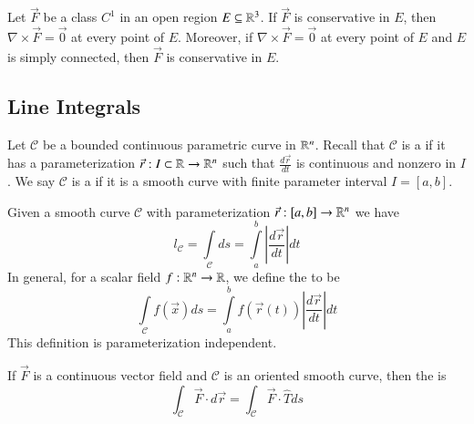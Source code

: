 \documentclass[12pt, a4paper, oneside, openright, titlepage]{book}
\begin{document}
\begin{appendices}
    
    \begin{thm}
        Let $\vec{F}$ be a class $C^1$ in an open region $E \subseteq \mathbb R^3$. If $\vec{F}$ is conservative in $E$, then $\nabla \times \vec{F} = \vec{0}$ at every point of $E$. Moreover, if $\nabla \times \vec{F} = \vec{0}$ at every point of $E$ and $E$ is simply connected, then $\vec{F}$ is conservative in $E$.
    \end{thm}
    
    
    \subsection{Line Integrals}
    
    \begin{defn}
        Let $\mathcal{C}$ be a bounded continuous parametric curve in $\mathbb R^n$. Recall that $\mathcal{C}$ is a  if it has a parameterization $\vec{r}:I\subset \mathbb R\rightarrow \mathbb R^n$ such that $\frac{d\vec{r}}{dt}$ is continuous and nonzero in $I$. We say $\mathcal{C}$ is a  if it is a smooth curve with finite parameter interval $I = [a,b]$.  
    \end{defn}
    
    \begin{defn}
        Given a smooth curve $\mathcal{C}$ with parameterization $\vec{r}:[a,b]\rightarrow \mathbb R^n$ we have \begin{equation}
            l_{\mathcal{C}} = \int\limits_{\mathcal{C}}ds = \int\limits_a^b\left|\frac{d\vec{r}}{dt}\right|dt
        \end{equation}
        In general, for a scalar field $f:\mathbb R^n \rightarrow \mathbb R$, we define the  to be \begin{equation}
            \int\limits_{\mathcal{C}}f(\vec{x})ds = \int\limits_a^bf(\vec{r}(t))\left|\frac{d\vec{r}}{dt}\right|dt
        \end{equation}
        This definition is parameterization independent.
    \end{defn}
    
    \begin{defn}
        If $\vec{F}$ is a continuous vector field and $\mathcal{C}$ is an oriented smooth curve, then the  is \begin{equation}
            \int_{\mathcal{C}}\vec{F}\cdot d\vec{r} = \int_{\mathcal{C}}\vec{F}\cdot \hat{T}ds
        \end{equation}
    \end{defn}
    

\end{appendices}
\end{document}
